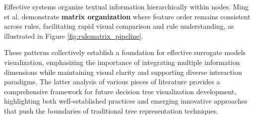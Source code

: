 Effective systems organize textual information hierarchically within nodes. Ming et al. \cite{ming2019rulematrix} demonstrate \textbf{matrix organization} where feature order remains consistent across rules, facilitating rapid visual comparison and rule understanding, as illustrated in Figure \ref{fig:rulematrix_pipeline}.

These patterns collectively establish a foundation for effective surrogate models visualization, emphasizing the importance of integrating multiple information dimensions while maintaining visual clarity and supporting diverse interaction paradigms. 
The latter analysis of various pieces of literature provides a comprehensive framework for future decision tree visualization development, highlighting both well-established practices and emerging innovative approaches that push the boundaries of traditional tree representation techniques.

